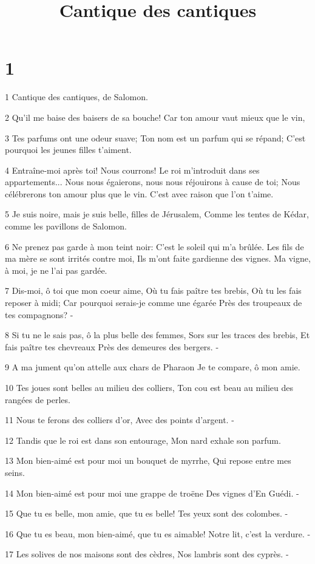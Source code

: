 

\title{Cantique des cantiques}


\chapter{1}

\par 1 Cantique des cantiques, de Salomon.
\par 2 Qu'il me baise des baisers de sa bouche! Car ton amour vaut mieux que le vin,
\par 3 Tes parfums ont une odeur suave; Ton nom est un parfum qui se répand; C'est pourquoi les jeunes filles t'aiment.
\par 4 Entraîne-moi après toi! Nous courrons! Le roi m'introduit dans ses appartements... Nous nous égaierons, nous nous réjouirons à cause de toi; Nous célébrerons ton amour plus que le vin. C'est avec raison que l'on t'aime.
\par 5 Je suis noire, mais je suis belle, filles de Jérusalem, Comme les tentes de Kédar, comme les pavillons de Salomon.
\par 6 Ne prenez pas garde à mon teint noir: C'est le soleil qui m'a brûlée. Les fils de ma mère se sont irrités contre moi, Ils m'ont faite gardienne des vignes. Ma vigne, à moi, je ne l'ai pas gardée.
\par 7 Dis-moi, ô toi que mon coeur aime, Où tu fais paître tes brebis, Où tu les fais reposer à midi; Car pourquoi serais-je comme une égarée Près des troupeaux de tes compagnons? -
\par 8 Si tu ne le sais pas, ô la plus belle des femmes, Sors sur les traces des brebis, Et fais paître tes chevreaux Près des demeures des bergers. -
\par 9 A ma jument qu'on attelle aux chars de Pharaon Je te compare, ô mon amie.
\par 10 Tes joues sont belles au milieu des colliers, Ton cou est beau au milieu des rangées de perles.
\par 11 Nous te ferons des colliers d'or, Avec des points d'argent. -
\par 12 Tandis que le roi est dans son entourage, Mon nard exhale son parfum.
\par 13 Mon bien-aimé est pour moi un bouquet de myrrhe, Qui repose entre mes seins.
\par 14 Mon bien-aimé est pour moi une grappe de troëne Des vignes d'En Guédi. -
\par 15 Que tu es belle, mon amie, que tu es belle! Tes yeux sont des colombes. -
\par 16 Que tu es beau, mon bien-aimé, que tu es aimable! Notre lit, c'est la verdure. -
\par 17 Les solives de nos maisons sont des cèdres, Nos lambris sont des cyprès. -

